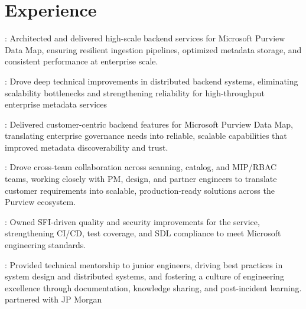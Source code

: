 \documentclass[]{main}
\begin{document}
\begin{minipage}[t]{0.73\textwidth} 


\section{Experience}

\vspace{\topsep} %
\begin{tightemize}
\item {}: Architected and delivered high-scale backend services for Microsoft Purview Data Map, ensuring resilient ingestion pipelines, optimized metadata storage, and consistent performance at enterprise scale. 
\item {}: Drove deep technical improvements in distributed backend systems, eliminating scalability bottlenecks and strengthening reliability for high-throughput enterprise metadata services
\item {}: Delivered customer-centric backend features for Microsoft Purview Data Map, translating enterprise governance needs into reliable, scalable capabilities that improved metadata discoverability and trust.
\item {}: Drove cross-team collaboration across scanning, catalog, and MIP/RBAC teams, working closely with PM, design, and partner engineers to translate customer requirements into scalable, production-ready solutions across the Purview ecosystem.
\item {}: Owned SFI-driven quality and security improvements for the service, strengthening CI/CD, test coverage, and SDL compliance to meet Microsoft engineering standards.
\item {}: Provided technical mentorship to junior engineers, driving best practices in system design and distributed systems, and fostering a culture of engineering excellence through documentation, knowledge sharing, and post-incident learning.
partnered with JP Morgan
\end{tightemize}
\sectionsep


\end{minipage}
\end{document}
